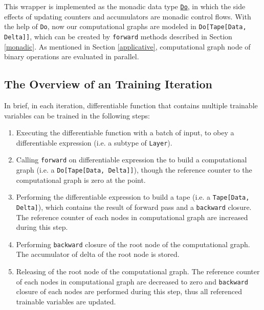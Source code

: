 This wrapper is implemented as the monadic data type \href{https://javadoc.io/page/com.thoughtworks.raii/asynchronous_2.11/latest/com/thoughtworks/raii/asynchronous$$Do.html}{\lstinline{Do}}, in which the side effects of updating counters and accumulators are monadic control flows. With the help of \lstinline{Do}, now our computational graphs are modeled in \lstinline{Do[Tape[Data, Delta]]}, which can be created by \lstinline{forward} methods described in Section \ref{monadic}. As mentioned in Section \ref{applicative}, \gls{computational graph} node of binary operations are evaluated in parallel.

\subsection{The Overview of an Training Iteration}

In brief, in each iteration, \gls{differentiable function} that contains multiple \glspl{trainable variable} can be trained in the following steps:

\begin{enumerate}
  \item Executing the \gls{differentiable function} with a batch of input, to obey a \gls{differentiable expression} (i.e. a subtype of \lstinline{Layer}).
  \label{obey}
  
  \item Calling \lstinline{forward} on \gls{differentiable expression} the to build a \gls{computational graph} (i.e. a \lstinline{Do[Tape[Data, Delta]]}), though the reference counter to the \gls{computational graph} is zero at the point.
  \label{build}
  
  \item Performing the \gls{differentiable expression} to build a tape (i.e. a \lstinline{Tape[Data, Delta]}), which contains the result of forward pass and a \lstinline{backward} closure. The reference counter of each nodes in \gls{computational graph} are increased during this step.
  \label{acquire}

  \item Performing \lstinline{backward} closure of the root node of the \gls{computational graph}. The accumulator of delta of the root node is stored.

  \item Releasing of the root node of the \gls{computational graph}. The reference counter of each nodes in \gls{computational graph} are decreased to zero and \lstinline{backward} closure of each nodes are performed during this step, thus all referenced \glspl{trainable variable} are updated.
  \label{release}

\end{enumerate}

